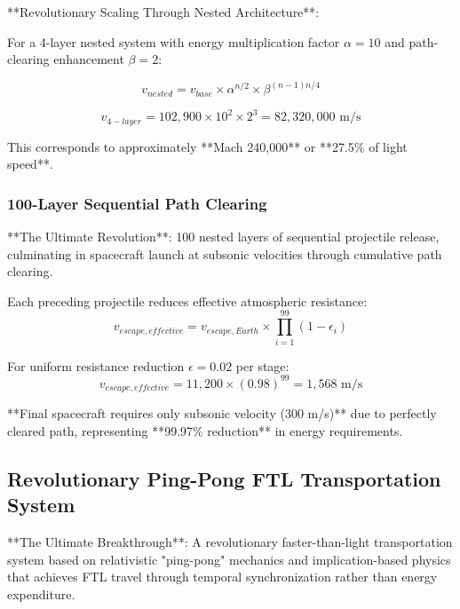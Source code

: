 \documentclass[12pt,a4paper]{article}
\theoremstyle{remark}
\begin{document}
**Revolutionary Scaling Through Nested Architecture**:

For a 4-layer nested system with energy multiplication factor $\alpha = 10$ and path-clearing enhancement $\beta = 2$:

\begin{equation}
v_{nested} = v_{base} \times \alpha^{n/2} \times \beta^{(n-1)n/4}
\end{equation}

\begin{equation}
v_{4-layer} = 102,900 \times 10^{2} \times 2^{3} = 82,320,000 \text{ m/s}
\end{equation}

This corresponds to approximately **Mach 240,000** or **27.5\% of light speed**.

\subsubsection{100-Layer Sequential Path Clearing}

**The Ultimate Revolution**: 100 nested layers of sequential projectile release, culminating in spacecraft launch at subsonic velocities through cumulative path clearing.

Each preceding projectile reduces effective atmospheric resistance:
\begin{equation}
v_{escape,effective} = v_{escape,Earth} \times \prod_{i=1}^{99} (1 - \epsilon_i)
\end{equation}

For uniform resistance reduction $\epsilon = 0.02$ per stage:
\begin{equation}
v_{escape,effective} = 11,200 \times (0.98)^{99} = 1,568 \text{ m/s}
\end{equation}

**Final spacecraft requires only subsonic velocity (300 m/s)** due to perfectly cleared path, representing **99.97\% reduction** in energy requirements.

\subsection{Revolutionary Ping-Pong FTL Transportation System}

**The Ultimate Breakthrough**: A revolutionary faster-than-light transportation system based on relativistic "ping-pong" mechanics and implication-based physics that achieves FTL travel through temporal synchronization rather than energy expenditure.
\end{document}
